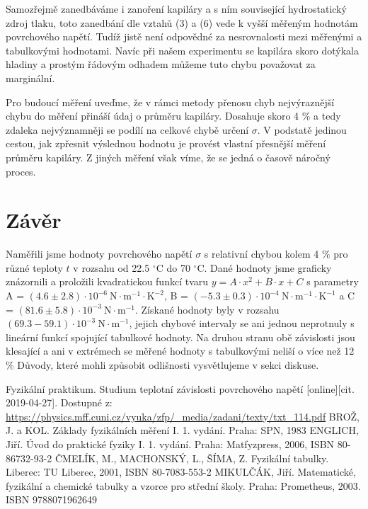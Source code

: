 \documentclass[a4paper]{article}
\begin{document}
\par Samozřejmě zanedbáváme i zanoření kapiláry a s ním související hydrostatický zdroj tlaku, toto zanedbání dle vztahů (3) a (6) vede k vyšší měřeným hodnotám povrchového napětí. Tudíž jistě není odpovědné za nesrovnalosti mezi měřenými a tabulkovými hodnotami. Navíc při našem experimentu se kapilára skoro dotýkala hladiny a prostým řádovým odhadem můžeme tuto chybu považovat za marginální.
\par Pro budoucí měření uveďme, že v rámci metody přenosu chyb nejvýraznější chybu do měření přináší údaj o průměru kapiláry. Dosahuje skoro 4 $\%$ a tedy zdaleka nejvýznamněji se podílí na celkové chybě určení $\sigma$. V podstatě jedinou cestou, jak zpřesnit výslednou hodnotu je provést vlastní přesnější měření průměru kapiláry. Z jiných měření však víme, že se jedná o časově náročný proces.
\section*{Závěr}
\par Naměřili jsme hodnoty povrchového napětí $\sigma$ s relativní chybou kolem 4 $\%$ pro různé teploty $t$ v rozsahu od 22.5 $^\circ$C do 70 $^\circ$C. Dané hodnoty jsme graficky znázornili a proložili kvadratickou funkcí tvaru $y = A \cdot x^{2} + B \cdot x + C$  s parametry A = $(4.6\pm2.8) \cdot 10^{-6} \: \mathrm{N \cdot m^{-1} \cdot K^{-2}}$, B = $(-5.3\pm0.3) \cdot 10^{-4}\:  \mathrm{N \cdot m^{-1} \cdot K^{-1}}$ a C = $(81.6\pm5.8) \cdot 10^{-3}\:  \mathrm{N \cdot m^{-1}}$. Získané hodnoty byly v rozsahu $(69.3-59.1)\cdot 10^{-3}\:  \mathrm{N \cdot m^{-1}}$, jejich chybové intervaly se ani jednou neprotnuly s lineární funkcí spojující tabulkové hodnoty. Na druhou stranu obě závislosti jsou klesající a ani v extrémech se měřené hodnoty s tabulkovými neliší o více než 12 $\%$ Důvody, které mohli způsobit odlišnosti vysvětlujeme v sekci diskuse.
\renewcommand\refname{Použitá literatura}
\begin{thebibliography}{}
Fyzikální praktikum. Studium teplotní závislosti povrchového napětí [online][cit. 2019-04-27]. Dostupné z:
\url{https://physics.mff.cuni.cz/vyuka/zfp/_media/zadani/texty/txt_114.pdf}
BROŽ, J. a KOL. Základy fyzikálních měření I. 1. vydání. Praha: SPN, 1983
ENGLICH, Jiří. Úvod do praktické fyziky I. 1. vydání. Praha: Matfyzpress, 2006, ISBN 80-86732-93-2
ČMELÍK, M., MACHONSKÝ, L., ŠÍMA, Z. Fyzikální tabulky. Liberec: TU Liberec, 2001, ISBN  80-7083-553-2
MIKULČÁK, Jiří. Matematické, fyzikální a chemické tabulky a vzorce
pro střední školy. Praha: Prometheus, 2003. ISBN 9788071962649
\end{thebibliography}
\end{document}
